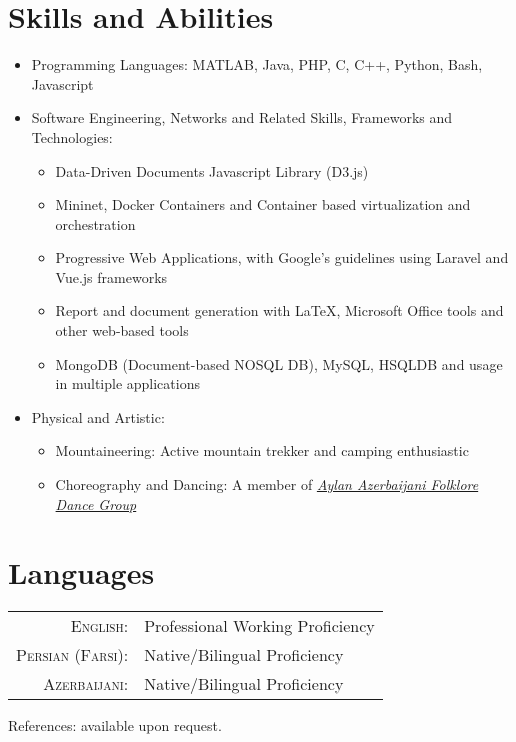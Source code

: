 \documentclass[a4paper,10pt]{article}
\begin{document}
\section{Skills and Abilities}
    \begin{itemize}
        \item Programming Languages: MATLAB, Java, PHP, C, C++, Python, Bash, Javascript
        \item Software Engineering, Networks and Related Skills, Frameworks and Technologies:
            \begin{itemize}
                \item Data-Driven Documents Javascript Library (D3.js)
                
                \item Mininet, Docker Containers and Container based virtualization and orchestration
                
                \item Progressive Web Applications, with Google's guidelines using Laravel and Vue.js frameworks
                
                \item Report and document generation with \LaTeX{}, Microsoft Office tools and other web-based tools
                
                \item MongoDB (Document-based NOSQL DB), MySQL, HSQLDB and usage in multiple applications
                
            \end{itemize}
        
        \item Physical and Artistic:
            \begin{itemize}
                \item Mountaineering: Active mountain trekker and camping enthusiastic
                
                \item Choreography and Dancing: A member of \emph{\href{https://aylandance.com}{Aylan Azerbaijani Folklore Dance Group}}
            \end{itemize}
    \end{itemize}
    
\section{Languages}
\begin{tabular}{rl}
    \textsc{English:}&Professional Working Proficiency\\
    \textsc{Persian (Farsi):}&Native/Bilingual Proficiency\\
    \textsc{Azerbaijani:}&Native/Bilingual Proficiency\\
\end{tabular}

References: available upon request.

\newpage

\end{document}
